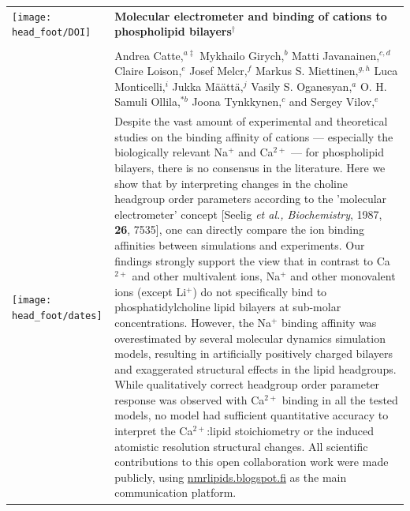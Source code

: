 \documentclass[twoside,twocolumn,9pt]{article}
\begin{document}
  \begin{@twocolumnfalse}
\vspace{3cm}
\sffamily
\begin{tabular}{m{4.5cm} p{13.5cm} }

\texttt{[image: head\_foot/DOI]} & \noindent\LARGE{\textbf{Molecular electrometer and binding of cations to phospholipid bilayers$^\dag$}} \\%
\vspace{0.3cm} & \vspace{0.3cm} \\

 & \noindent\large{Andrea Catte,\textit{$^{a\ddag}$} Mykhailo Girych,\textit{$^{b}$} Matti Javanainen,\textit{$^{c,d}$} Claire Loison,\textit{$^{e}$} Josef Melcr,\textit{$^{f}$} Markus S. Miettinen,\textit{$^{g,h}$} Luca Monticelli,\textit{$^{i}$} Jukka M{\"a}{\"a}tt{\"a},\textit{$^{j}$} Vasily S. Oganesyan,\textit{$^{a}$} O. H. Samuli Ollila,\textit{$^{\ast b}$} Joona Tynkkynen,\textit{$^{c}$} and Sergey Vilov,\textit{$^{e}$}
} \\%

\texttt{[image: head\_foot/dates]} & \noindent\normalsize{
Despite the vast amount of experimental and theoretical studies on the binding affinity of cations ---
especially the biologically relevant Na$^+$ and Ca$^{2+}$ --- for phospholipid bilayers, there is no consensus in the literature. 
Here we show that by interpreting changes in the choline headgroup order parameters according to the 'molecular electrometer' 
concept [Seelig \textit{et al., Biochemistry}, 1987, \textbf{26}, 7535], one can directly compare the ion binding affinities between simulations and experiments.
Our findings strongly support the view that in contrast to Ca$^{2+}$ and other multivalent ions, Na$^+$ and other monovalent ions
(except Li$^+$) do not specifically bind to phosphatidylcholine lipid bilayers at sub-molar concentrations. However, the Na$^+$ binding affinity was 
overestimated by several molecular dynamics simulation models, resulting in
artificially positively charged bilayers and exaggerated structural effects in the lipid headgroups. 
While qualitatively correct headgroup order parameter response was observed with
Ca$^{2+}$ binding in all the tested models, no model had sufficient 
quantitative accuracy to interpret the Ca$^{2+}$:lipid stoichiometry or the induced atomistic resolution structural changes.
All scientific contributions to this open collaboration work were made publicly, using \url{nmrlipids.blogspot.fi} as the main communication platform.} \\%

\end{tabular}

 \end{@twocolumnfalse} \vspace{0.6cm}
\end{document}
